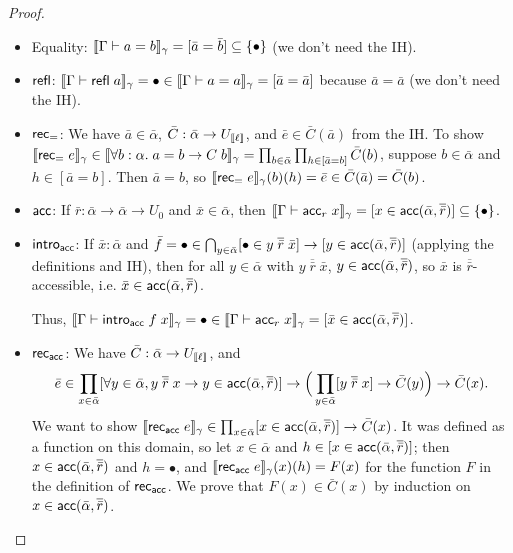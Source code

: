 \begin{proof}
\begin{itemize}
\item Equality: $\scott{\Gamma\vdash a=b}_\gamma=[\bar a=\bar b]\subseteq\{\bullet\}$ (we don't need the IH).
\item $\mathsf{refl}$: $\scott{\Gamma\vdash \refl\;a}_\gamma=\bullet\in\scott{\Gamma\vdash a=a}_\gamma=[\bar a=\bar a]$ because $\bar a=\bar a$ (we don't need the IH).
\item $\mathsf{rec}_=$: We have $\bar a\in\bar\alpha$, $\bar C:\bar\alpha\to U_{\llbracket \ell\rrbracket}$, and $\bar e\in\bar C(\bar a)$ from the IH. To show $\llbracket \mathsf{rec}_=\;e\rrbracket_\gamma\in\llbracket \forall b:\alpha.\;a=b\to C\;b\rrbracket_\gamma=\prod_{b\in\bar\alpha}\prod_{h\in[\bar a=b]}\bar C(b)$, suppose $b\in\bar\alpha$ and $h\in[\bar a=b]$. Then $\bar a=b$, so $\llbracket \mathsf{rec}_=\;e\rrbracket_\gamma(b)(h)=\bar e\in \bar C(\bar a)=\bar C(b)$.
\item $\mathsf{acc}$: If $\bar r:\bar\alpha\to\bar\alpha\to U_0$ and $\bar x\in\bar\alpha$, then $\scott{\Gamma\vdash\acc_r\;x}_\gamma=[x\in\acc(\bar\alpha,\overline{\bar r})]\subseteq\{\bullet\}$.
\item $\mathsf{intro}_{\mathsf{acc}}$: If $\bar x:\bar\alpha$ and $\bar f=\bullet\in\bigcap_{y\in\bar\alpha}[\bullet\in y\;\overline{\bar r}\;\bar x]\to[y\in\mathsf{acc}(\bar\alpha,\overline{\bar r})]$ (applying the definitions and IH), then for all $y\in\bar\alpha$ with $y\;\overline{\bar r}\;\bar x$, $y\in\mathsf{acc}(\bar\alpha,\overline{\bar r})$, so $\bar x$ is $\overline{\bar r}$-accessible, i.e. $\bar x\in\mathsf{acc}(\bar\alpha,\overline{\bar r})$.

Thus, $\scott{\Gamma\vdash\intro_\acc\;f\;x}_\gamma=\bullet\in\scott{\Gamma\vdash\acc_r\;x}_\gamma=[\bar x\in\acc(\bar\alpha,\overline{\bar r})]$.
\item $\mathsf{rec}_{\mathsf{acc}}$: We have $\bar C:\bar\alpha\to U_{\llbracket \ell\rrbracket}$, and
$$\bar e\in\prod_{x\in\bar\alpha}[\forall y\in\bar\alpha,y\;\overline{\bar r}\;x\to y\in\mathsf{acc}(\bar\alpha,\overline{\bar r})]\to\Big(\prod_{y\in\bar\alpha}[y\;\overline{\bar r}\;x]\to\bar C(y)\Big)\to\bar C(x).$$
We want to show $\llbracket \mathsf{rec}_{\mathsf{acc}}\;e\rrbracket_\gamma\in\prod_{x\in\bar\alpha}[x\in\mathsf{acc}(\bar\alpha,\overline{\bar r})]\to\bar C(x)$. It was defined as a function on this domain, so let $x\in\bar\alpha$ and $h\in[x\in\mathsf{acc}(\bar\alpha,\overline{\bar r})]$; then $x\in\mathsf{acc}(\bar\alpha,\overline{\bar r})$ and $h=\bullet$, and $\llbracket \mathsf{rec}_{\mathsf{acc}}\;e\rrbracket_\gamma(x)(h)=F(x)$ for the function $F$ in the definition of $\mathsf{rec}_{\mathsf{acc}}$. We prove that $F(x)\in\bar C(x)$ by induction on $x\in\mathsf{acc}(\bar\alpha,\overline{\bar r})$.


\end{itemize}
\end{proof}
